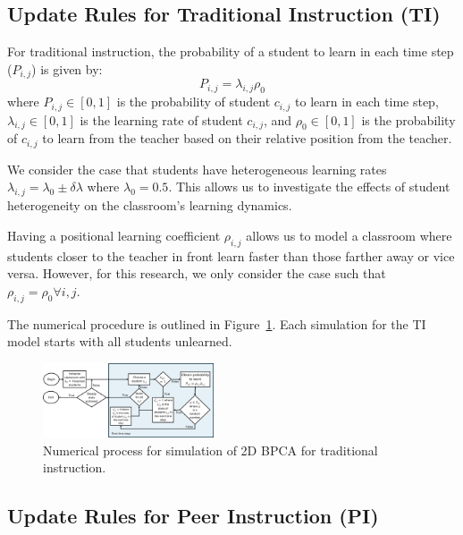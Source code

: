 \documentclass[twocolumn,secnumarabic,amssymb, nobibnotes, aps, prd]{revtex4-2}
\begin{document}
    \subsection{Update Rules for Traditional Instruction (TI)}

        For traditional instruction, the probability of a student to learn in each time step ($P_{i,j}$) is given by:
        \begin{equation}
            P_{i,j} = \lambda_{i,j}\rho_0
        \end{equation}
        where
        $P_{i,j} \in [0,1]$ is the probability of student $c_{i,j}$ to learn in each time step, 
        $\lambda_{i,j} \in [0,1]$ is the learning rate of student $c_{i,j}$, and
        $\rho_{0} \in [0,1]$ is the probability of $c_{i,j}$ to learn from the teacher based on their relative position from the teacher.

        We consider the case that students have heterogeneous learning rates $\lambda_{i,j}=\lambda_0 \pm \delta\lambda$ where $\lambda_0=0.5$.
        This allows us to investigate the effects of student heterogeneity on the classroom's learning dynamics.

        Having a positional learning coefficient $\rho_{i,j}$ allows us to model a classroom where students closer to the teacher in front learn faster than those farther away or vice versa.
        However, for this research, we only consider the case such that $\rho_{i,j} = \rho_0 \forall i,j$.

        The numerical procedure is outlined in Figure~\ref{fig:TI flowchart}.
        Each simulation for the TI model starts with all students unlearned.
        \begin{figure}[htbp!]
            \centering
            \includegraphics[width=0.45\textwidth]{figures/2DBPCA TI Flowchart.png}
            \caption[Traditional instruction simulation flowchart]{Numerical process for simulation of 2D BPCA for traditional instruction.}
            \label{fig:TI flowchart}
        \end{figure}

    \subsection{Update Rules for Peer Instruction (PI)}
\end{document}
